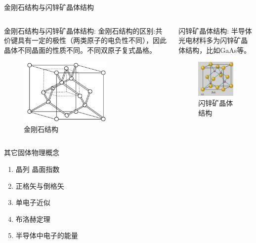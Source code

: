 \documentclass[trans]{beamer} %
\begin{document}
\begin{frame}{金刚石结构与闪锌矿晶体结构}

    \begin{columns}
        \begin{column}{0.5\textwidth}
        
        \begin{exampleblock}{金刚石结构与闪锌矿晶体结构:}
        金刚石结构的区别:共价键具有一定的极性（两类原子的电负性不同），因此晶体不同晶面的性质不同。不同双原子复式晶格。
        
      \end{exampleblock}
             \begin{figure}[htbp] 
            \centering\includegraphics[width=1.75in]{source/ch2/fg208.png} \caption{金刚石结构}
            \end{figure}
        \end{column}
        \begin{column}{0.5\textwidth}
        \begin{exampleblock}{闪锌矿晶体结构:}
      半导体光电材料多为闪锌矿晶体结构，比如GaAs等。

      \end{exampleblock}
        \begin{figure}[htbp] 
            \centering\includegraphics[width=1.75in]{source/ch2/fg209.png} \caption{闪锌矿晶体结构}\label{fig:10} 
            \end{figure}
        
        \end{column}
        \end{columns}
\end{frame}

\begin{frame}{其它固体物理概念}

    \begin{enumerate}[(1)]
    \item<2-| alert@2>晶列 晶面指数
    \item<2-| alert@3>正格矢与倒格矢
    \item<2-| alert@4>单电子近似
    \item<2-| alert@5> 布洛赫定理
    \item<2-| alert@6> 半导体中电子的能量
    \end{enumerate}
\end{frame}
\end{document}
